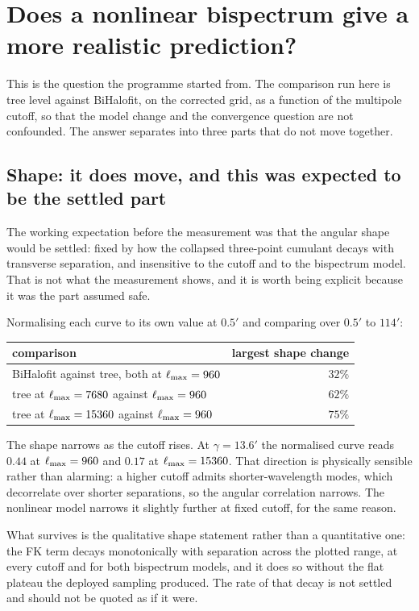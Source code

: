 \section{Does a nonlinear bispectrum give a more realistic prediction?}
\label{sec:nonlinear}

This is the question the programme started from. The comparison run here is
tree level against BiHalofit, on the corrected grid, as a function of the
multipole cutoff, so that the model change and the convergence question are
not confounded. The answer separates into three parts that do not move
together.

\subsection{Shape: it does move, and this was expected to be the settled part}

The working expectation before the measurement was that the angular shape
would be settled: fixed by how the collapsed three-point cumulant decays
with transverse separation, and insensitive to the cutoff and to the
bispectrum model. That is not what the measurement shows, and it is worth
being explicit because it was the part assumed safe.

Normalising each curve to its own value at $0.5'$ and comparing over
$0.5'$ to $114'$:

\begin{center}
\begin{tabular}{lr}
\toprule
comparison & largest shape change \\
\midrule
BiHalofit against tree, both at $\ell_{\max}=960$ & $32\%$ \\
tree at $\ell_{\max}=7680$ against $\ell_{\max}=960$   & $62\%$ \\
tree at $\ell_{\max}=15360$ against $\ell_{\max}=960$  & $75\%$ \\
\bottomrule
\end{tabular}
\end{center}

The shape narrows as the cutoff rises. At $\gamma=13.6'$ the normalised
curve reads $0.44$ at $\ell_{\max}=960$ and $0.17$ at $\ell_{\max}=15360$. That
direction is physically sensible rather than alarming: a higher cutoff
admits shorter-wavelength modes, which decorrelate over shorter
separations, so the angular correlation narrows. The nonlinear model
narrows it slightly further at fixed cutoff, for the same reason.

What survives is the qualitative shape statement rather than a quantitative
one: the FK term decays monotonically with separation across the plotted
range, at every cutoff and for both bispectrum models, and it does so
without the flat plateau the deployed sampling produced. The rate of that
decay is not settled and should not be quoted as if it were.

